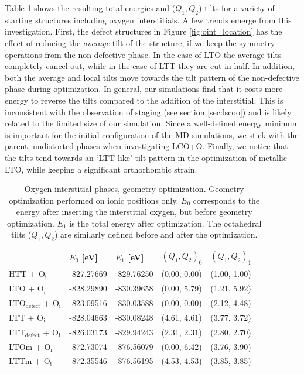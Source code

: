 Table \ref{tab:oint_lcoo_en} shows the resulting total energies and ($Q_1, Q_2$) tilts for a variety of starting structures including oxygen interstitials. A few trends emerge from this investigation. First, the defect structures in Figure \ref{fig:oint_location} has the effect of reducing the \emph{average} tilt of the structure, if we keep the symmetry operations from the non-defective phase. In the case of LTO the average tilts completely cancel out, while in the case of LTT they are cut in half. In addition, both the average and local tilts move towards the tilt pattern of the non-defective phase during optimization. In general, our simulations find that it costs more energy to reverse the tilts compared to the addition of the interstitial. This is inconsistent with the observation of staging (see section \ref{sec:lscoo}) and is likely related to the limited size of our simulation. Since a well-defined energy minimum is important for the initial configuration of the MD simulations, we stick with the parent, undistorted phases when investigating LCO+O. Finally, we notice that the tilts tend towards an `LTT-like' tilt-pattern in the optimization of metallic LTO, while keeping a significant orthorhombic strain. 

\begin{table}[b]
	\centering
	\caption[Oxygen interstitial phases: Energy]{Oxygen interstitial phases, geometry optimization. Geometry optimization performed on ionic positions only. $E_0$ corresponds to the energy after inserting the interstitial oxygen, but before geometry optimization. $E_1$ is the total energy after optimization. The octahedral tilts ($Q_1, Q_2$) are similarly defined before and after the optimization.}
	\label{tab:oint_lcoo_en}
	\begin{tabular}{llllll}
    \toprule
	 & $E_0$ [eV] & $E_1$ [eV] & $(Q_1, Q_2)_0$ & $(Q_1, Q_2)_1$  \\ 
	\midrule
    HTT + O$_\text{i}$                    & -827.27669             & -829.76250 & (0.00, 0.00) & (1.00, 1.00) \\
    LTO + O$_\text{i}$                    & -828.29890             & -830.39658  & (0.00, 5.79) & (1.21, 5.92) \\
    LTO$_\text{defect}$ + O$_\text{i}$            & -823.09516             & -830.03588  & (0.00, 0.00) & (2.12, 4.48) \\
    LTT + O$_\text{i}$                    & -828.04663             & -830.08248  & (4.61, 4.61) & (3.77, 3.72) \\
	LTT$_\text{defect}$ + O$_\text{i}$             & -826.03173             & -829.94243  & (2.31, 2.31) & (2.80, 2.70) \\
	LTOm + O$_\text{i}$                & -872.73074             & -876.56079  & (0.00, 6.42) & (3.76, 3.90) \\
	LTTm + O$_\text{i}$                & -872.35546             & -876.56195  & (4.53, 4.53) & (3.85, 3.85) \\
	\bottomrule
    \end{tabular}
\end{table}

